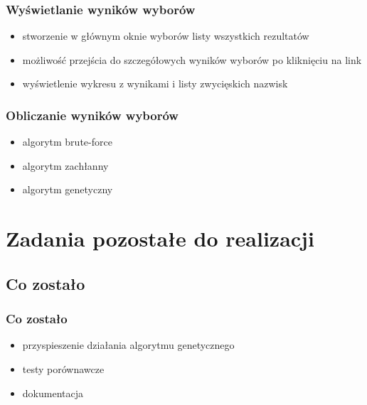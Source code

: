 \documentclass{beamer}
\begin{document}

\begin{frame}

\frametitle{Wyświetlanie wyników wyborów}
\begin{itemize}
\item stworzenie w głównym oknie wyborów listy wszystkich rezultatów
\item możliwość przejścia do szczegółowych wyników wyborów po kliknięciu na link
\item wyświetlenie wykresu z wynikami i listy zwycięskich nazwisk 
\end{itemize}

\end{frame}


\begin{frame}

\frametitle{Obliczanie wyników wyborów}
\begin{itemize}
\item algorytm brute-force
\item algorytm zachłanny
\item algorytm genetyczny
\end{itemize}

\end{frame}




\section{Zadania pozostałe do realizacji}

\subsection{Co zostało}

\begin{frame}

\frametitle{Co zostało}
\begin{itemize}
\item przyspieszenie działania algorytmu genetycznego
\item testy porównawcze
\item dokumentacja
\end{itemize}

\end{frame}
\end{document}
